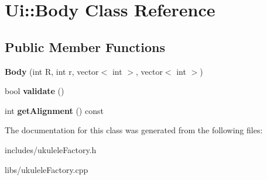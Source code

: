 \hypertarget{class_ui_1_1_body}{}\section{Ui\+:\+:Body Class Reference}
\label{class_ui_1_1_body}
\subsection*{Public Member Functions}
\begin{DoxyCompactItemize}
\item 
\hypertarget{class_ui_1_1_body_a23d10a63b0e8e30b1c102dbfd202a8fb}{}\label{class_ui_1_1_body_a23d10a63b0e8e30b1c102dbfd202a8fb} 
{\bfseries Body} (int R, int r, vector$<$ int $>$, vector$<$ int $>$)
\item 
\hypertarget{class_ui_1_1_body_ac5677819724a41c46e33259bf3ec0936}{}\label{class_ui_1_1_body_ac5677819724a41c46e33259bf3ec0936} 
bool {\bfseries validate} ()
\item 
\hypertarget{class_ui_1_1_body_a3ca6ee78527da6da60ee8717644985ab}{}\label{class_ui_1_1_body_a3ca6ee78527da6da60ee8717644985ab} 
int {\bfseries get\+Alignment} () const
\end{DoxyCompactItemize}


The documentation for this class was generated from the following files\+:\begin{DoxyCompactItemize}
\item 
includes/ukulele\+Factory.\+h\item 
libs/ukulele\+Factory.\+cpp\end{DoxyCompactItemize}
